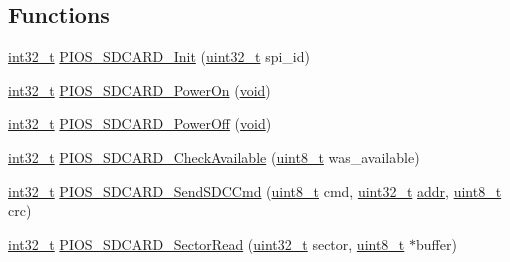 \subsection*{Functions}
\begin{DoxyCompactItemize}
\item 
\hyperlink{group___n_a_m_e_gafd12020da5a235dfcf0c3c748fb5baed}{int32\-\_\-t} \hyperlink{group___p_i_o_s___s_d_c_a_r_d_gafcf19e938cb1102c075e231a0422361d}{P\-I\-O\-S\-\_\-\-S\-D\-C\-A\-R\-D\-\_\-\-Init} (\hyperlink{stdint_8h_a435d1572bf3f880d55459d9805097f62}{uint32\-\_\-t} spi\-\_\-id)
\item 
\hyperlink{group___n_a_m_e_gafd12020da5a235dfcf0c3c748fb5baed}{int32\-\_\-t} \hyperlink{group___p_i_o_s___s_d_c_a_r_d_ga23ea31da97543b106a04b4bf33d844e5}{P\-I\-O\-S\-\_\-\-S\-D\-C\-A\-R\-D\-\_\-\-Power\-On} (\hyperlink{group___n_a_m_e_ga18028b8badbf1ea7e704ccac3c488e82}{void})
\item 
\hyperlink{group___n_a_m_e_gafd12020da5a235dfcf0c3c748fb5baed}{int32\-\_\-t} \hyperlink{group___p_i_o_s___s_d_c_a_r_d_gaac93bac78ab965688f0dde791eb1c048}{P\-I\-O\-S\-\_\-\-S\-D\-C\-A\-R\-D\-\_\-\-Power\-Off} (\hyperlink{group___n_a_m_e_ga18028b8badbf1ea7e704ccac3c488e82}{void})
\item 
\hyperlink{group___n_a_m_e_gafd12020da5a235dfcf0c3c748fb5baed}{int32\-\_\-t} \hyperlink{group___p_i_o_s___s_d_c_a_r_d_gada5c80d2151f7b9a68c35861cc5d2923}{P\-I\-O\-S\-\_\-\-S\-D\-C\-A\-R\-D\-\_\-\-Check\-Available} (\hyperlink{stdint_8h_aba7bc1797add20fe3efdf37ced1182c5}{uint8\-\_\-t} was\-\_\-available)
\item 
\hyperlink{group___n_a_m_e_gafd12020da5a235dfcf0c3c748fb5baed}{int32\-\_\-t} \hyperlink{group___p_i_o_s___s_d_c_a_r_d_ga06575fc4cc50c8f4856d5fd5bde3450b}{P\-I\-O\-S\-\_\-\-S\-D\-C\-A\-R\-D\-\_\-\-Send\-S\-D\-C\-Cmd} (\hyperlink{stdint_8h_aba7bc1797add20fe3efdf37ced1182c5}{uint8\-\_\-t} cmd, \hyperlink{stdint_8h_a435d1572bf3f880d55459d9805097f62}{uint32\-\_\-t} \hyperlink{group___c_m_s_i_s___core___instruction_interface_gae5c31572d72f992f107a67f7c4e80d5b}{addr}, \hyperlink{stdint_8h_aba7bc1797add20fe3efdf37ced1182c5}{uint8\-\_\-t} crc)
\item 
\hyperlink{group___n_a_m_e_gafd12020da5a235dfcf0c3c748fb5baed}{int32\-\_\-t} \hyperlink{group___p_i_o_s___s_d_c_a_r_d_gaf68bf693b2b96af5862f021bbd0753d3}{P\-I\-O\-S\-\_\-\-S\-D\-C\-A\-R\-D\-\_\-\-Sector\-Read} (\hyperlink{stdint_8h_a435d1572bf3f880d55459d9805097f62}{uint32\-\_\-t} sector, \hyperlink{stdint_8h_aba7bc1797add20fe3efdf37ced1182c5}{uint8\-\_\-t} $\ast$buffer)
\item 

\end{DoxyCompactItemize}
